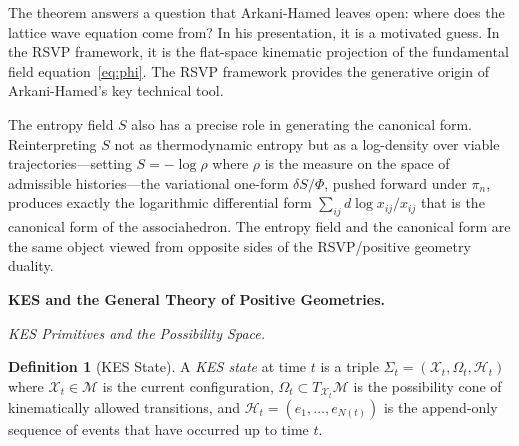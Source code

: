 \documentclass[12pt, oneside]{amsart}
\theoremstyle{plain}
\theoremstyle{definition}
\newtheorem{definition}[theorem]{Definition}
\theoremstyle{remark}
\newcommand{\Phif}{\Phi}
\newcommand{\Sf}{S}
\newcommand{\XKS}{\mathcal{X}}
\newcommand{\OmKS}{\Omega}
\newcommand{\HKS}{\mathcal{H}}
\begin{document}
The theorem answers a question that Arkani-Hamed leaves open: where does the lattice wave equation come from? In his presentation, it is a motivated guess. In the RSVP framework, it is the flat-space kinematic projection of the fundamental field equation~\eqref{eq:phi}. The RSVP framework provides the generative origin of Arkani-Hamed's key technical tool.

The entropy field $\Sf$ also has a precise role in generating the canonical form. Reinterpreting $\Sf$ not as thermodynamic entropy but as a log-density over viable trajectories---setting $\Sf = -\log \rho$ where $\rho$ is the measure on the space of admissible histories---the variational one-form $\delta\Sf / \Phif$, pushed forward under $\pi_n$, produces exactly the logarithmic differential form $\sum_{ij} d\log x_{ij} / x_{ij}$ that is the canonical form of the associahedron. The entropy field and the canonical form are the same object viewed from opposite sides of the RSVP/positive geometry duality.

\bigskip\noindent\textbf{KES and the General Theory of Positive Geometries.}
\label{sec:kes}

\medskip\noindent\textit{KES Primitives and the Possibility Space.}

\begin{definition}[KES State]
A \emph{KES state} at time $t$ is a triple $\Sigma_t = (\XKS_t, \OmKS_t, \HKS_t)$ where $\XKS_t \in \mathcal{M}$ is the current configuration, $\OmKS_t \subset T_{\XKS_t}\mathcal{M}$ is the possibility cone of kinematically allowed transitions, and $\HKS_t = (e_1, \ldots, e_{N(t)})$ is the append-only sequence of events that have occurred up to time $t$.
\end{definition}
\end{document}
